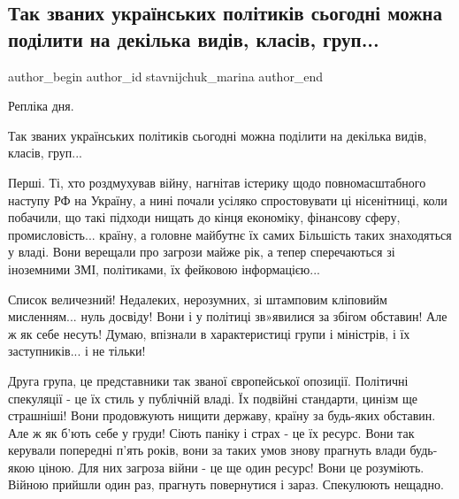  
 
 
 
 
 
\subsection{Так званих українських політиків сьогодні можна поділити на декілька видів, класів, груп...}
\label{sec:30_01_2022.fb.stavnijchuk_marina.1.ukr_politiki_gruppy}
 
\ifcmt
 author_begin
   author_id stavnijchuk_marina
 author_end
\fi

Репліка дня. 

Так званих українських політиків сьогодні можна поділити на декілька видів,
класів, груп... 

Перші. Ті, хто роздмухував війну, нагнітав істерику щодо повномасштабного
наступу РФ на Україну, а нині почали усіляко спростовувати ці нісенітниці, коли
побачили, що такі підходи нищать до кінця економіку, фінансову сферу,
промисловість... країну, а головне майбутнє їх самих Більшість таких
знаходяться у владі. Вони верещали про загрози майже рік, а тепер сперечаються
зі іноземними ЗМІ, політиками, їх фейковою інформацією...

Список величезний! Недалеких, нерозумних, зі штамповим  кліповийм мисленням...
нуль досвіду! Вони і у політиці зв»явилися за збігом обставин! Але ж як себе
несуть! Думаю, впізнали в характеристиці групи і міністрів, і їх заступників...
і не тільки! 

Друга група, це представники так званої європейської опозиції. Політичні
спекуляції - це їх стиль у публічній владі. Їх подвійні стандарти, цинізм ще
страшніші! Вони продовжують нищити державу, країну за будь-яких обставин.  Але
ж як б’ють себе у груди! Сіють паніку і страх - це їх ресурс. Вони так керували
попередні п’ять років, вони за таких умов знову прагнуть влади будь-якою ціною.
Для них загроза війни - це ще один ресурс! Вони це  розуміють. Війною прийшли
один раз, прагнуть повернутися і зараз. Спекулюють нещадно. 

